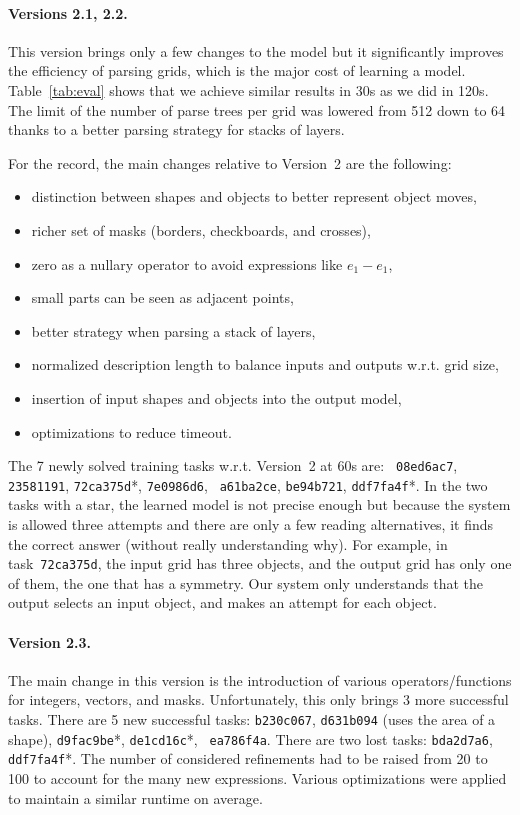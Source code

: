 \documentclass[a4paper]{llncs}
\begin{document}
\paragraph{Versions 2.1, 2.2.} This version brings only a few changes to the
model but it significantly improves the efficiency of parsing grids,
which is the major cost of learning a model. Table~\ref{tab:eval}
shows that we achieve similar results in 30s as we did in 120s. The
limit of the number of parse trees per grid was lowered from 512 down
to 64 thanks to a better parsing strategy for stacks of layers.

For the record, the main changes relative to Version~2 are the following:
\begin{itemize}
\item distinction between shapes and objects to better represent object moves,
\item richer set of masks (borders, checkboards, and crosses),
\item zero as a nullary operator to avoid expressions like $e_1 - e_1$,
\item small parts can be seen as adjacent points,
\item better strategy when parsing a stack of layers,
\item normalized description length to balance inputs and outputs w.r.t. grid size,
\item insertion of input shapes and objects into the output model,
\item optimizations to reduce timeout.
\end{itemize}

The 7 newly solved training tasks w.r.t. Version~2 at 60s are: {\tt
  08ed6ac7}, {\tt 23581191}, {\tt 72ca375d}*, {\tt 7e0986d6}, {\tt
  a61ba2ce}, {\tt be94b721}, {\tt ddf7fa4f}*. In the two tasks with a
star, the learned model is not precise enough but because the system
is allowed three attempts and there are only a few reading
alternatives, it finds the correct answer (without really
understanding why). For example, in task~{\tt 72ca375d}, the input
grid has three objects, and the output grid has only one of them, the
one that has a symmetry. Our system only understands that the output
selects an input object, and makes an attempt for each object.

\paragraph{Version 2.3.} The main change in this version is the
introduction of various operators/functions for integers, vectors, and
masks. Unfortunately, this only brings 3 more successful tasks. There
are 5 new successful tasks: {\tt b230c067}, {\tt d631b094} (uses the
area of a shape), {\tt d9fac9be}*, {\tt de1cd16c}*, {\tt
  ea786f4a}. There are two lost tasks: {\tt bda2d7a6}, {\tt
  ddf7fa4f}*.
%
The number of considered refinements had to be raised from 20 to 100
to account for the many new expressions. Various optimizations were
applied to maintain a similar runtime on average.
\end{document}
